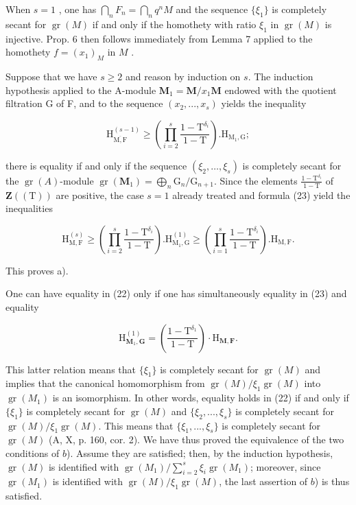When \(s = 1\) , one has \(\bigcap_{n} F_{n} = \bigcap_{n} q^{n} M\) and the sequence \(\{\xi_{1}\}\) is completely secant for \(\operatorname{gr}(M)\) if and only if the homothety with ratio \(\xi_{1}\) in \(\operatorname{gr}(M)\) is injective. Prop. 6 then follows immediately from Lemma 7 applied to the homothety \(f = (x_{1})_{M}\) in \(M\) .

Suppose that we have \(s \geqslant 2\) and reason by induction on \(s\). The induction hypothesis applied to the A-module \(\mathbf{M}_{1} = \mathbf{M}/x_{1}\mathbf{M}\) endowed with the quotient filtration G of F, and to the sequence \((x_{2}, ..., x_{s})\) yields the inequality

\[
\mathrm{H} _ {\overline {{\mathrm{M,F}}}} ^ {(s - 1)} \geqslant \left(\prod_ {i = 2} ^ {s} \frac {1 - \mathrm{T} ^ {\delta_ {i}}}{1 - \mathrm{T}}\right). \mathrm{H} _ {\mathrm{M} _ {1}, \mathrm{G}};\tag{23}
\]

there is equality if and only if the sequence \((\xi_{2}, \ldots, \xi_{s})\) is completely secant for the \(\operatorname{gr}(A)\)-module \(\operatorname{gr}(\mathbf{M}_{1}) = \bigoplus_{n} \mathrm{G}_{n}/\mathrm{G}_{n+1}\). Since the elements \(\frac{1 - \mathrm{T}^{\delta_{i}}}{1 - \mathrm{T}}\) of \(\mathbf{Z}((\mathrm{T}))\) are positive, the case \(s = 1\) already treated and formula (23) yield the inequalities

\[
\mathrm{H} _ {\mathrm{M}, \mathrm{F}} ^ {(s)} \geqslant \left(\prod_ {i = 2} ^ {s} \frac {1 - \mathrm{T} ^ {\delta_ {i}}}{1 - \mathrm{T}}\right). \mathrm{H} _ {\mathrm{M} _ {1}, \mathrm{G}} ^ {(1)} \geqslant \left(\prod_ {i = 1} ^ {s} \frac {1 - \mathrm{T} ^ {\delta_ {i}}}{1 - \mathrm{T}}\right). \mathrm{H} _ {\mathrm{M}, \mathrm{F}}.\tag{24}
\]

This proves a).

One can have equality in (22) only if one has simultaneously equality in (23) and equality

\[
\mathrm{H} _ {\mathbf {M} _ {1}, \mathbf {G}} ^ {(1)} = \left(\frac {1 - \mathrm{T} ^ {\delta_ {1}}}{1 - \mathrm{T}}\right) \cdot \mathrm{H} _ {\mathbf {M}, \mathbf {F}}.\tag{25}
\]

This latter relation means that \(\{\xi_{1}\}\) is completely secant for \(\operatorname{gr}(M)\) and implies that the canonical homomorphism from \(\operatorname{gr}(M)/\xi_{1}\operatorname{gr}(M)\) into \(\operatorname{gr}(M_{1})\) is an isomorphism. In other words, equality holds in (22) if and only if \(\{\xi_{1}\}\) is completely secant for \(\operatorname{gr}(M)\) and \(\{\xi_{2}, ..., \xi_{s}\}\) is completely secant for \(\operatorname{gr}(M)/\xi_{1}\operatorname{gr}(M)\). This means that \(\{\xi_{1}, ..., \xi_{s}\}\) is completely secant for \(\operatorname{gr}(M)\) (A, X, p. 160, cor. 2). We have thus proved the equivalence of the two conditions of \(b\)). Assume they are satisfied; then, by the induction hypothesis, \(\operatorname{gr}(M)\) is identified with \(\operatorname{gr}(M_{1})/\sum_{i=2}^{s} \xi_{i}\operatorname{gr}(M_{1})\); moreover, since \(\operatorname{gr}(M_{1})\) is identified with \(\operatorname{gr}(M)/\xi_{1}\operatorname{gr}(M)\), the last assertion of \(b\)) is thus satisfied.


